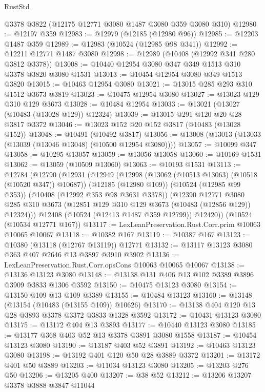 \begin{lexlean}{RustStd}
\begin{coremodule}
    @3378
    @3822
    (@12175 @12771 @3080 @1487 @3080 @359 @3080 @310)
@12980 := @12197 @359
@12983 := @12979 (@12185 (@12980 @96))
@12985 := @12203 @1487 @359
@12989 := @12983 (@10524 (@12985 @98 @341))
@12992 := @12211 @12771 @1487 @3080
@12998 := @12989 (@10408 (@12992 @341 @280 @3812 @3378))
@13008 := @10440 @12954 @3080 @347 @349 @1513 @310 @3378 @3820 @3080 @1531
@13013 := @10454 @12954 @3080 @349 @1513 @3820
@13015 := @10463 @12954 @3080
@13021 := @13015 @285 @293 @310 @1512 @3673 @3819
@13023 := @10475 @12954 @3080
@13027 := @13023 @129 @310 @129 @3673
@13028 := @10484 @12954
@13033 := @13021 (@13027 (@10483 (@13028 @129)) @12324)
@13039 := @13015 @291 @120 @20 @28 @3817 @3372
@13046 := @13023 @152 @20 @152 @3817 (@10483 (@13028 @152))
@13048 := @10491 (@10492 @3817)
@13056 := @13008 (@13013 (@13033 (@13039 (@13046 @13048) (@10500 @12954 @3080))))
@13057 := @10099 @347
@13058 := @10295 @13057
@13059 := @13056 @13058
@13060 := @10169 @1531
@13062 := @13059 (@10509 @13060)
@13063 := @10193 @1531
@13113 := @12784
    (@12790
      (@12931
        (@12949
          (@12998 (@13062 (@10513 @13063) (@10518 (@10520 @347)) @10687))
          (@12185 (@12980 @109))
          (@10524 (@12985 @99 @353))
          (@10408 (@12992 @353 @98 @3631 @3378))
          (@12390
            @12771
            @3080
            @285
            @310
            @3673
            (@12851 @129 @310 @129 @3673 (@10483 (@12856 @129)) @12324)))
        @12408
        (@10524 (@12413 @1487 @359 @12799))
        @12420))
    (@10524 (@10534 @12771 @167))
@13117 := LexLeanPreservation.Rust.Corr.prim @10063 @10065 @10067
@13118 := @10382 @167
@13119 := @10387 @167
@13123 := @10380 (@13118 (@12767 @13119)) @12771
@13132 := @13117 @13123 @3080 @363 @407 @2646 @13 @3897 @3910 @3902
@13136 := LexLeanPreservation.Rust.Corr.opsCons @10063 @10065 @10067
@13138 := @13136 @13123 @3080
@13148 := @13138 @131 @406 @13 @102 @3389 @3896 @3909 @3833 @1306 @3592
@13150 := @10475 @13123 @3080
@13154 := @13150 @109 @13 @109 @3389
@13155 := @10484 @13123
@13160 := @13148 (@13154 (@10483 (@13155 @109)) @10626)
@13170 := @13138 @404 @120 @13 @28 @3893 @3378 @3372 @3833 @1328 @3592
@13172 := @10431 @13123 @3080
@13175 := @13172 @404 @13 @3893
@13177 := @10440 @13123 @3080
@13185 := @13177 @368 @403 @52 @13 @3378 @3891 @3080 @1558
@13187 := @10454 @13123 @3080
@13190 := @13187 @403 @52 @3891
@13192 := @10463 @13123 @3080
@13198 := @13192 @401 @120 @50 @28 @3889 @3372
@13201 := @13172 @401 @50 @3889
@13203 := @11034 @13123 @3080
@13205 := @13203 @276 @50
@13206 := @13205 @400
@13207 := @38 @52
@13212 := @13206 @13207 @3378 @3888 @3847 @11044

\end{coremodule}
\end{lexlean}
